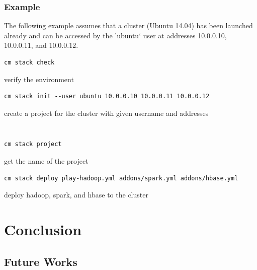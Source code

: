 \subsubsection{Example}

The following example assumes that a cluster (Ubuntu
14.04) has been launched already and can be accessed by
the 'ubuntu` user at addresses 10.0.0.10, 10.0.0.11, and
10.0.0.12.


\begin{Verbatim}[fontfamily=helvetica]
cm stack check
\end{Verbatim}
verify the environment


\begin{Verbatim}[fontfamily=helvetica]
cm stack init --user ubuntu 10.0.0.10 10.0.0.11 10.0.0.12
\end{Verbatim}

create a project for the cluster with given username and addresses


\begin{Verbatim}[fontfamily=helvetica]

\end{Verbatim}

\begin{Verbatim}[fontfamily=helvetica]

\end{Verbatim}

\begin{Verbatim}[fontfamily=helvetica]
cm stack project
\end{Verbatim}

get the name of the project

\begin{Verbatim}[fontfamily=helvetica]
cm stack deploy play-hadoop.yml addons/spark.yml addons/hbase.yml
\end{Verbatim}

deploy hadoop, spark, and hbase to the cluster





\section{Conclusion}


\subsection{Future Works}



